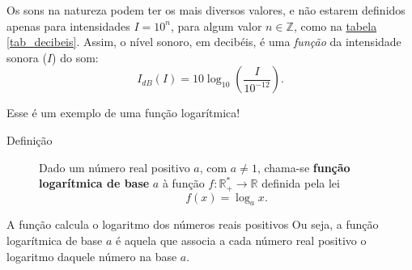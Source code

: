 
Os sons na natureza podem ter os mais diversos valores, e não estarem definidos apenas para intensidades $I = 10^n$, para algum valor $n \in \mathbb{Z}$, como na \hyperref[tab_decibeis]{tabela \ref{tab_decibeis}}. Assim, o nível sonoro, em decibéis, é uma \textit{função} da intensidade sonora ($I$) do som:
$$
I_{dB}(I) = 10 \log_{10} \left(\frac{I}{10^{-12}}\right).
$$

Esse é um exemplo de uma função logarítmica!

\begin{description}
\item[Definição]\label{teo_mud_base}
Dado um número real positivo $a$, com $a \neq 1$, chama-se \textbf{função logarítmica de base} $a$ à função $f: \mathbb{R}_+^* \to \mathbb{R}$ definida pela lei
$$
f(x) = \log_a x.
$$
\end{description}

\begin{observationtitle}{A função calcula o logaritmo dos números reais positivos}
Ou seja, a função logarítmica de base $a$ é aquela que associa a cada número real positivo o logaritmo daquele número na base $a$.
\end{observationtitle}


